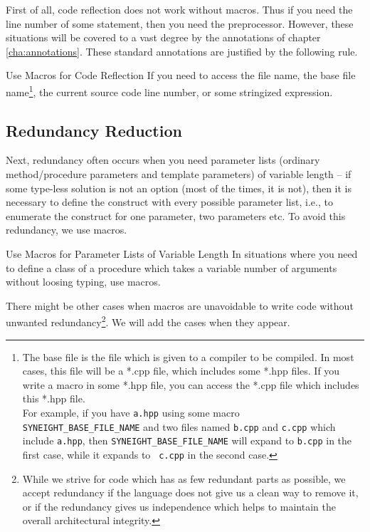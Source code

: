 First of all, code reflection does not work without macros. Thus if
you need the line number of some statement, then you need the
preprocessor. However, these situations will be covered to a vast
degree by the annotations of chapter \vref{cha:annotations}.  These
standard annotations are justified by the following rule.
%
\begin{rule*}{Use Macros for Code Reflection}
  If you need to access the file name, the base file name\footnote{The
    base file is the file which is given to a compiler to be
    compiled. In most cases, this file will be a *.cpp file, which
    includes some *.hpp files. If you write a macro in some *.hpp file,
    you can access the *.cpp file which includes this *.hpp file.\\
    For example, if you have {\tt a.hpp} using some macro {\tt
      SYNEIGHT\_BASE\_FILE\_NAME} and two files named {\tt b.cpp} and
    {\tt c.cpp}
    which include {\tt a.hpp}, then {\tt SYNEIGHT\_BASE\_FILE\_NAME} will
    expand to {\tt b.cpp} in the first case, while it expands to {\tt
      c.cpp} in the second case.},
  the current source code line number, or some stringized expression.
\end{rule*}
%


\subsection{Redundancy Reduction}
\label{sec:redundancy-reduction}

Next, redundancy often occurs when you need parameter lists (ordinary
method/procedure parameters and template parameters) of variable length
-- if some type-less solution is not an option (most of the times, it
is not), then it is necessary to define the construct with every
possible parameter list, i.e., to enumerate the construct for one
parameter, two parameters etc. To avoid this redundancy, we use
macros.
%
\begin{rule*}{Use Macros for Parameter Lists of Variable Length}
  In situations where you need to define a class of a procedure which
  takes a variable number of arguments without loosing
  typing, use macros.
\end{rule*}
%
%
There might be other cases when macros are unavoidable to write code
without unwanted redundancy\footnote{While we strive for code which
  has as few redundant parts as possible, we accept redundancy if the
  language does not give us a clean way to remove it, or if the
  redundancy gives us independence which helps to maintain the overall
  architectural integrity.}. We will add the cases when they appear.


